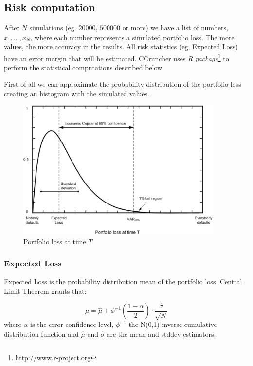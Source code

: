 \documentclass[a4paper,12pt,final]{article}
\begin{document}
\subsection{Risk computation}
After $N$ simulations (eg. $20000$, $500000$ or more) we have a list
of numbers, ${x_1, ..., x_N}$, where each number represents a simulated portfolio 
loss. The more values, the more accuracy in the results. All risk statistics (eg. 
Expected Loss) have an error margin that will be estimated. CCruncher uses 
\emph{R package}\footnote{http://www.r-project.org} to perform the statistical
computations described below.
\newline

First of all we can approximate the probability distribution of the portfolio 
loss creating an histogram with the simulated values.

\begin{figure}[!hbt]
\begin{center}
\includegraphics[height=7cm, angle=0]{./images/creditvar.eps}
\caption{Portfolio loss at time $T$}
\label{creditvar}
\end{center}
\end{figure}
\FloatBarrier

\subsubsection{Expected Loss}
Expected Loss is the probability distribution mean of the portfolio loss.
Central Limit Theorem \cite{stats:schaum} grants that:

\begin{displaymath}
\mu = \widehat{\mu} \pm \phi^{-1}\left(\frac{1-\alpha}{2}\right) \cdot \frac{\widehat{\sigma}}{\sqrt{N}}
\end{displaymath}
where $\alpha$ is the error confidence level, $\phi^{-1}$ the N(0,1) inverse 
cumulative distribution function and $\widehat{\mu}$ and $\widehat{\sigma}$ are 
the mean and stddev estimators:
\end{document}
